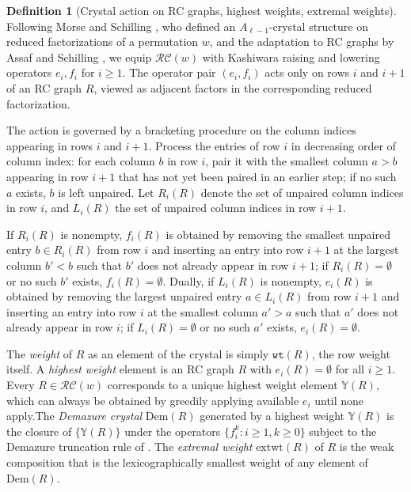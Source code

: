 \documentclass[a4paper,fleqn]{cas-sc}
\theoremstyle{definition}
\newtheorem{definition}[lemma]{Definition}
\theoremstyle{remark}
\numberwithin{equation}{subsection}
\newcommand{\wtt}{\mathtt{wt}}
\newcommand{\RC}{\mathcal{RC}}
\begin{document}
\begin{definition}[Crystal action on RC graphs, highest weights, extremal weights] \label{definition:crystal}
Following Morse and Schilling \cite{morse2016crystal}, who defined an $A_{\ell-1}$-crystal structure on reduced factorizations of a permutation $w$, and the adaptation to RC graphs by Assaf and Schilling \cite{assaf2018demazure}, we equip $\RC(w)$ with Kashiwara raising and lowering operators $e_i, f_i$ for $i\geq 1$. The operator pair $(e_i, f_i)$ acts only on rows $i$ and $i+1$ of an RC graph $R$, viewed as adjacent factors in the corresponding reduced factorization.

The action is governed by a bracketing procedure on the column indices appearing in rows $i$ and $i+1$. Process the entries of row $i$ in decreasing order of column index: for each column $b$ in row $i$, pair it with the smallest column $a>b$ appearing in row $i+1$ that has not yet been paired in an earlier step; if no such $a$ exists, $b$ is left unpaired. Let $R_i(R)$ denote the set of unpaired column indices in row $i$, and $L_i(R)$ the set of unpaired column indices in row $i+1$.

If $R_i(R)$ is nonempty, $f_i(R)$ is obtained by removing the smallest unpaired entry $b\in R_i(R)$ from row $i$ and inserting an entry into row $i+1$ at the largest column $b' < b$ such that $b'$ does not already appear in row $i+1$; if $R_i(R) = \emptyset$ or no such $b'$ exists, $f_i(R) = \emptyset$. Dually, if $L_i(R)$ is nonempty, $e_i(R)$ is obtained by removing the largest unpaired entry $a\in L_i(R)$ from row $i+1$ and inserting an entry into row $i$ at the smallest column $a' > a$ such that $a'$ does not already appear in row $i$; if $L_i(R) = \emptyset$ or no such $a'$ exists, $e_i(R) = \emptyset$.

The \emph{weight} of $R$ as an element of the crystal is simply $\wtt(R)$, the row weight itself. A \emph{highest weight} element is an RC graph $R$ with $e_i(R) = \emptyset$ for all $i\geq 1$. Every $R\in \RC(w)$ corresponds to a unique highest weight element $\mathbb{Y}(R)$, which can always be obtained by greedily applying available $e_i$ until none apply.The \emph{Demazure crystal} $\mathrm{Dem}(R)$ generated by a highest weight $\mathbb{Y}(R)$ is the closure of $\{\mathbb{Y}(R)\}$ under the operators $\{f_i^k : i\geq 1, k\geq 0\}$ subject to the Demazure truncation rule of \cite{assaf2018demazure}. The \emph{extremal weight} $\mathrm{extwt}(R)$ of $R$ is the weak composition that is the lexicographically smallest weight of any element of $\mathrm{Dem}(R)$.
\end{definition}
\end{document}
